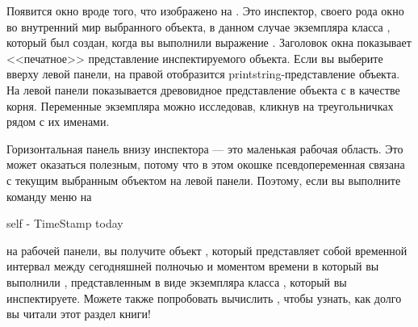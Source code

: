 \documentclass[a4paper,10pt,twoside]{book}
\begin{document}
Появится окно вроде того, что изображено на .
Это инспектор, своего рода окно во внутренний мир выбранного объекта, в данном случае экземпляра класса \mbox{},
который был создан, когда вы выполнили выражение .
Заголовок окна показывает <<печатное>> представление инспектируемого объекта.
Если вы выберите  вверху левой панели, на правой отобразится printstring-представление объекта.
На левой панели показывается древовидное представление объекта с \self в качестве корня.
Переменные экземпляра можно исследовав, кликнув на треугольничках рядом с их именами.

Горизонтальная панель внизу инспектора --- это маленькая рабочая область. Это может оказаться полезным, потому что в этом окошке псевдопеременная  связана с текущим выбранным объектом на левой панели.
Поэтому, если вы выполните команду меню  на
\begin{code}{}
self - TimeStamp today
\end{code}
на рабочей панели, вы получите объект , который представляет собой временной интервал между сегодняшней полночью и моментом времени в который вы выполнили , представленным в виде экземпляра класса , который вы инспектируете.
Можете также попробовать вычислить , чтобы узнать, как долго вы читали этот раздел книги!
\end{document}
